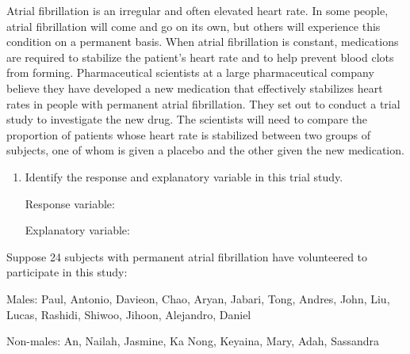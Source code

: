\documentclass[
]{report}
\begin{document}
Atrial fibrillation is an irregular and often elevated heart rate. In some people, atrial fibrillation will come and go on its own, but others will experience this condition on a permanent basis. When atrial fibrillation is constant, medications are required to stabilize the patient's heart rate and to help prevent blood clots from forming. Pharmaceutical scientists at a large pharmaceutical company believe they have developed a new medication that effectively stabilizes heart rates in people with permanent atrial fibrillation. They set out to conduct a trial study to investigate the new drug. The scientists will need to compare the proportion of patients whose heart rate is stabilized between two groups of subjects, one of whom is given a placebo and the other given the new medication.

\begin{enumerate}
\def\labelenumi{\arabic{enumi}.}
\setcounter{enumi}{2}
\item
  Identify the response and explanatory variable in this trial study.

  Response variable:
  \vspace{0.25in}

  Explanatory variable:
  \vspace{0.25in}
\end{enumerate}

\newpage

Suppose 24 subjects with permanent atrial fibrillation have volunteered to participate in this study:

Males: Paul, Antonio, Davieon, Chao, Aryan, Jabari, Tong, Andres, John, Liu, Lucas, Rashidi, Shiwoo, Jihoon, Alejandro, Daniel

Non-males: An, Nailah, Jasmine, Ka Nong, Keyaina, Mary, Adah, Sassandra
\end{document}
